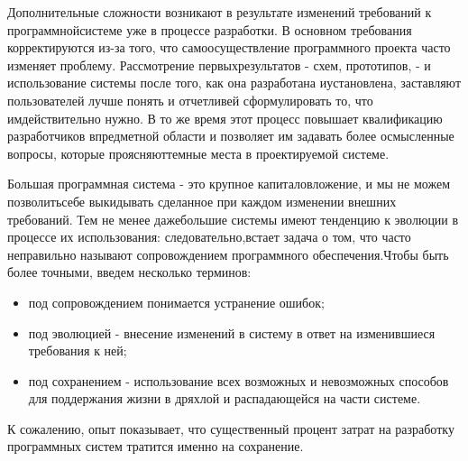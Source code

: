 \documentclass[10pt]{article}
\begin{document}
Дополнительные сложности возникают в результате изменений требований к программной\linebreak  системе уже в процессе разработки. В основном требования корректируются из-за того, что само\linebreak  осуществление программного проекта часто изменяет проблему. Рассмотрение первых\linebreak  результатов - схем, прототипов, - и использование системы после того, как она разработана и\linebreak  установлена, заставляют пользователей лучше понять и отчетливей сформулировать то, что им\linebreak  действительно нужно. В то же время этот процесс повышает квалификацию разработчиков в\linebreak  предметной области и позволяет им задавать более осмысленные вопросы, которые проясняют\linebreak  темные места в проектируемой системе. 

Большая программная система - это крупное капиталовложение, и мы не можем позволить\linebreak  себе выкидывать сделанное при каждом изменении внешних требований. Тем не менее даже\linebreak  большие системы имеют тенденцию к эволюции в процессе их использования: следовательно,\linebreak  встает задача о том, что часто неправильно называют сопровождением программного обеспечения.\linebreak  Чтобы быть более точными, введем несколько терминов: 
\begin{itemize}
\item \hspace{0.5cm} под сопровождением понимается устранение ошибок;
\item \hspace{0.5cm} под эволюцией - внесение изменений в систему в ответ на изменившиеся требования к ней;
\item \hspace{0.5cm} под сохранением - использование всех возможных и невозможных способов для поддержания жизни в дряхлой и распадающейся на части системе.
\end{itemize}
К сожалению, опыт показывает, что существенный процент затрат на разработку программных систем тратится именно на сохранение. 
\end{document}
